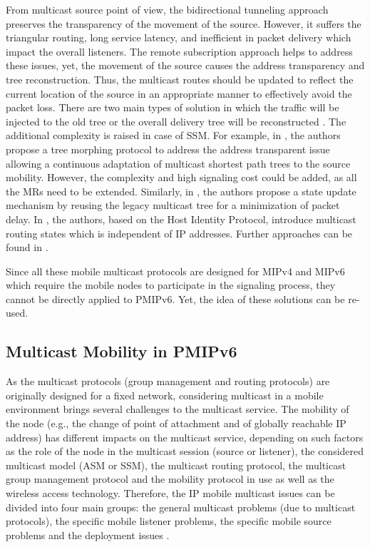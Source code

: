 From multicast source point of view, the bidirectional tunneling approach preserves the transparency of the movement of the source. However, it suffers the triangular routing, long service latency, and inefficient in packet delivery which impact the overall listeners. The remote subscription approach helps to address these issues, yet, the movement of the source causes the address transparency and tree reconstruction. Thus, the multicast routes should be updated to reflect the current location of the source in an appropriate manner to effectively avoid the packet loss. There are two main types of solution in which the traffic will be injected to the old tree or the overall delivery tree will be reconstructed \cite{Multicast_MIPv6}. The additional complexity is raised in case of SSM. For example, in \cite{tree_morphing_Schmidt, tree_morphing_Christ}, the authors propose a tree morphing protocol to address the address transparent issue allowing a continuous adaptation of multicast shortest path trees to the source mobility. However, the complexity and high signaling cost could be added, as all the MRs need to be extended. Similarly, in \cite{PMIP_multicast_source_Lee}, the authors propose a state update mechanism by reusing the legacy multicast tree for a minimization of packet delay. In \cite{host_identity_multicast}, the authors, based on the Host Identity Protocol, introduce multicast routing states which is independent of IP addresses. Further approaches can be found in \cite{multicast_challenges_solutions,Multicast_MIPv6,multicast_source_Wang}. 

Since all these mobile multicast protocols are designed for MIPv4 and MIPv6 which require the mobile nodes to participate in the signaling process, they cannot be directly applied to PMIPv6. Yet, the idea of these solutions can be re-used. 

\subsection{Multicast Mobility in PMIPv6}
As the multicast protocols (group management and routing protocols) are originally designed for a fixed network, considering multicast in a mobile environment brings several challenges to the multicast service. The mobility of the node  (e.g., the change of point of attachment and of globally reachable IP address) has different impacts on the multicast service, depending on such factors as the role of the node in the multicast session (source or listener), the considered multicast model (ASM or SSM), the multicast routing protocol, the multicast group management protocol and the mobility protocol in use as well as the wireless access technology. Therefore, the IP mobile multicast issues can be divided into four main groups: the general multicast problems (due to multicast protocols), the specific mobile listener problems, the specific mobile source problems and the deployment issues \cite{Multicast_MIPv6, multicast_challenges_solutions,tuning_MLD}.

